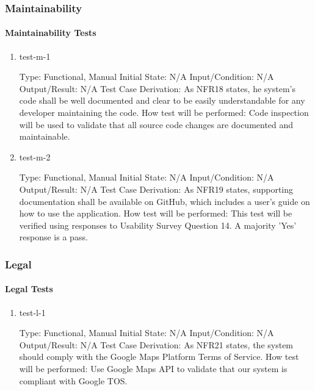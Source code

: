 \documentclass[12pt, titlepage]{article}
\begin{document}
\subsubsection{Maintainability}

\paragraph{Maintainability Tests}

\begin{enumerate}

\item{test-m-1\\}

Type: Functional, Manual		
Initial State: N/A	
Input/Condition: N/A		
Output/Result: N/A
Test Case Derivation: As NFR18 states, he system's code shall be well documented and clear to be easily understandable for any developer maintaining the code.
How test will be performed: Code inspection will be used to validate that all source code changes are documented and maintainable. 

\item{test-m-2\\}

Type: Functional, Manual
Initial State: N/A
Input/Condition: N/A
Output/Result: N/A
Test Case Derivation: As NFR19 states, supporting documentation shall be available on GitHub, which includes a user's guide on how to use the application.	
How test will be performed: This test will be verified using responses to Usability Survey Question 14. A majority 'Yes' response is a pass.

\end{enumerate}

\subsubsection{Legal}

\paragraph{Legal Tests}

\begin{enumerate}

\item{test-l-1\\}

Type: Functional, Manual
Initial State: N/A	
Input/Condition: N/A		
Output/Result: N/A
Test Case Derivation: As NFR21 states, the system should comply with the Google Maps Platform Terms of Service.
How test will be performed: Use Google Maps API to validate that our system is compliant with Google TOS. 

\end{enumerate}
\end{document}
